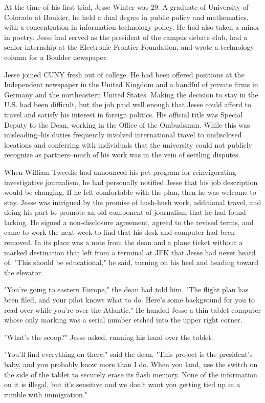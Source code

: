 At the time of his first trial, Jesse Winter was 29.  A graduate of University of Colorado at Boulder, he held a dual degree in public policy and mathematics, with a concentration in information technology policy.  He had also taken a minor in poetry.  Jesse had served as the president of the campus debate club, had a senior internship at the Electronic Frontier Foundation, and wrote a technology column for a Boulder newspaper.

Jesse joined CUNY fresh out of college.  He had been offered positions at the Independent newspaper in the United Kingdom and a handful of private firms in Germany and the northeastern United States.  Making the decision to stay in the U.S. had been difficult, but the job paid well enough that Jesse could afford to travel and satisfy his interest in foreign politics.  His official title was Special Deputy to the Dean, working in the Office of the Ombudsman.  While this was misleading--his duties frequently involved international travel to undisclosed locations and conferring with individuals that the university could not publicly recognize as partners--much of his work was in the vein of settling disputes.

When William Tweedie had announced his pet program for reinvigorating investigative journalism, he had personally notified Jesse that his job description would be changing.  If he felt comfortable with the plan, then he was welcome to stay.  Jesse was intrigued by the promise of hush-hush work, additional travel, and doing his part to promote an old component of journalism that he had found lacking.  He signed a non-disclosure agreement, agreed to the revised terms, and came to work the next week to find that his desk and computer had been removed.  In its place was a note from the dean and a plane ticket without a marked destination that left from a terminal at JFK that Jesse had  never heard of.  "This should be educational," he said, turning on his heel and heading toward the elevator.

"You're going to eastern Europe," the dean had told him.  "The flight plan has been filed, and your pilot knows what to do.  Here's some background for you to read over while you're over the Atlantic."  He handed Jesse a thin tablet computer whose only marking was a serial number etched into the upper right corner.

"What's the scoop?" Jesse asked, running his hand over the tablet.

"You'll find everything on there," said the dean.  "This project is the president's baby, and you probably know more than I do.  When you land, use the switch on the side of the tablet to securely erase its flash memory.  None of the information on it is illegal, but it's sensitive and we don't want you getting tied up in a rumble with immigration."

